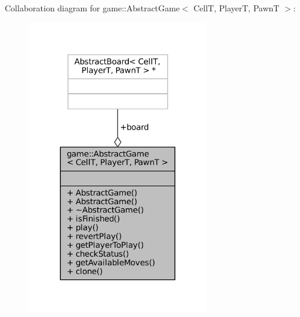 Collaboration diagram for game\+:\+:Abstract\+Game$<$ CellT, PlayerT, PawnT $>$\+:
\nopagebreak
\begin{figure}[H]
\begin{center}
\leavevmode
\includegraphics[width=224pt]{classgame_1_1_abstract_game__coll__graph}
\end{center}
\end{figure}
